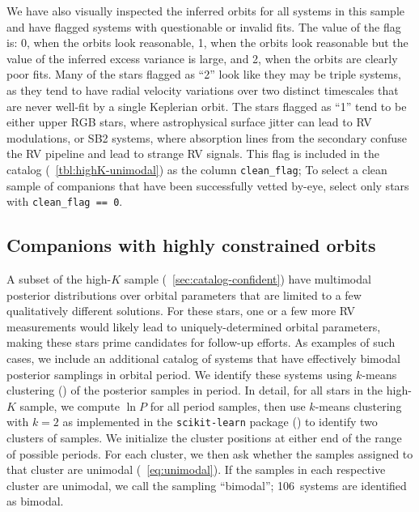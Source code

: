 \documentclass[modern, letterpaper]{aastex62}
\newcommand{\nbimodal}{106}
\begin{document}
We have also visually inspected the inferred orbits for all systems in this
sample and have flagged systems with questionable or invalid fits.
The value of the flag is: 0, when the orbits look reasonable, 1, when the orbits
look reasonable but the value of the inferred excess variance is large, and 2,
when the orbits are clearly poor fits.
Many of the stars flagged as ``2'' look like they may be triple systems, as they
tend to have radial velocity variations over two distinct timescales that are
never well-fit by a single Keplerian orbit.
The stars flagged as ``1'' tend to be either upper RGB stars, where
astrophysical surface jitter can lead to RV modulations, or SB2 systems, where
absorption lines from the secondary confuse the RV pipeline and lead to strange
RV signals.
This flag is included in the catalog (\tablename~\ref{tbl:highK-unimodal}) as
the column \texttt{clean\_flag}; To select a clean sample of companions that
have been successfully vetted by-eye, select only stars with
\texttt{clean\_flag == 0}.


\subsection{Companions with highly constrained orbits}
\label{sec:catalog-multimodal}

A subset of the high-$K$ sample (\sectionname~\ref{sec:catalog-confident}) have
multimodal posterior distributions over orbital parameters that are limited to
a few qualitatively different solutions.
For these stars, one or a few more RV measurements would likely lead to
uniquely-determined orbital parameters, making these stars prime candidates for
follow-up efforts.
As examples of such cases, we include an additional catalog of systems that have
effectively bimodal posterior samplings in orbital period.
We identify these systems using $k$-means clustering (\citealt{Lloyd:1982}) of
the posterior samples in period.
In detail, for all stars in the high-$K$ sample, we compute $\ln P$ for all
period samples, then use $k$-means clustering with $k=2$ as implemented in the
\texttt{scikit-learn} package (\citealt{Pedregosa:2011}) to identify two
clusters of samples.
We initialize the cluster positions at either end of the range of possible
periods.
For each cluster, we then ask whether the samples assigned to that cluster are
unimodal (\eqname~\ref{eq:unimodal}).
If the samples in each respective cluster are unimodal, we call the sampling
``bimodal''; \nbimodal\ systems are identified as bimodal.
\end{document}
